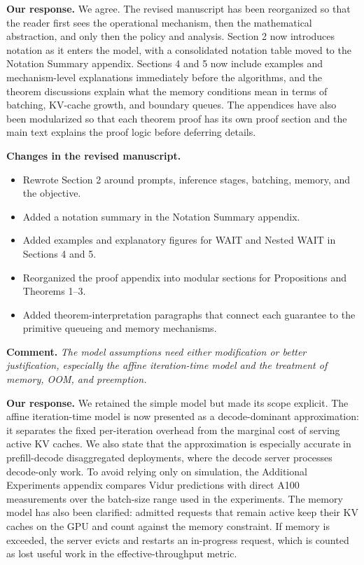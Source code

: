 \documentclass[11pt]{article}
\newcommand{\comment}[1]{%
  \vspace{0.25em}
  \noindent\textbf{Comment.} \emph{#1}
}
\newcommand{\response}{\vspace{0.25em}\noindent\textbf{Our response.} }
\newcommand{\changes}{\vspace{0.25em}\noindent\textbf{Changes in the revised manuscript.} }
\begin{document}
\response We agree. The revised manuscript has been reorganized so that the reader first sees the operational mechanism, then the mathematical abstraction, and only then the policy and analysis. Section 2 now introduces notation as it enters the model, with a consolidated notation table moved to the Notation Summary appendix. Sections 4 and 5 now include examples and mechanism-level explanations immediately before the algorithms, and the theorem discussions explain what the memory conditions mean in terms of batching, KV-cache growth, and boundary queues. The appendices have also been modularized so that each theorem proof has its own proof section and the main text explains the proof logic before deferring details.

\changes
\begin{itemize}
    \item Rewrote Section 2 around prompts, inference stages, batching, memory, and the objective.
    \item Added a notation summary in the Notation Summary appendix.
    \item Added examples and explanatory figures for WAIT and Nested WAIT in Sections 4 and 5.
    \item Reorganized the proof appendix into modular sections for Propositions and Theorems 1--3.
    \item Added theorem-interpretation paragraphs that connect each guarantee to the primitive queueing and memory mechanisms.
\end{itemize}

\comment{The model assumptions need either modification or better justification, especially the affine iteration-time model and the treatment of memory, OOM, and preemption.}

\response We retained the simple model but made its scope explicit. The affine iteration-time model is now presented as a decode-dominant approximation: it separates the fixed per-iteration overhead from the marginal cost of serving active KV caches. We also state that the approximation is especially accurate in prefill-decode disaggregated deployments, where the decode server processes decode-only work. To avoid relying only on simulation, the Additional Experiments appendix compares Vidur predictions with direct A100 measurements over the batch-size range used in the experiments. The memory model has also been clarified: admitted requests that remain active keep their KV caches on the GPU and count against the memory constraint. If memory is exceeded, the server evicts and restarts an in-progress request, which is counted as lost useful work in the effective-throughput metric.
\end{document}
